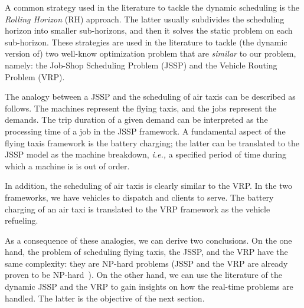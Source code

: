 A common strategy used in the literature to tackle the dynamic scheduling is the \textit{Rolling Horizon} (\acs{RH}) approach. The latter usually subdivides the scheduling horizon into smaller sub-horizons, and then it solves the static problem on each sub-horizon. These strategies are used in the literature to tackle (the dynamic version of) two well-know optimization problem that are \emph{similar} to our problem, namely: the Job-Shop Scheduling Problem (\acs{JSSP}) and the Vehicle Routing Problem (\acs{VRP}). 

The analogy between a \acs{JSSP} and the scheduling of air taxis can be described as follows. The machines represent the flying taxis, and the jobs represent the demands. The trip duration of a given demand can be interpreted as the processing time of a job in the \acs{JSSP} framework. A fundamental aspect of the flying taxis framework is the battery charging; the latter can be translated to the \acs{JSSP} model as the machine breakdown, \textit{i.e.,} a specified period of time during which a machine is is out of order.

In addition, the scheduling of air taxis is clearly similar to the \acs{VRP}. In the two frameworks, we have vehicles to dispatch and clients to serve. The battery charging of an air taxi is translated to the VRP framework as the vehicle refueling.

As a consequence of these analogies, we can derive two conclusions. On the one hand, the problem of scheduling flying taxis, the \acs{JSSP}, and the \acs{VRP} have the same complexity: they are NP-hard problems (\acs{JSSP} and the \acs{VRP} are already proven to be NP-hard~\cite{mohan2019,song2016}). On the other hand, we can use the literature of the dynamic \acs{JSSP} and the \acs{VRP} to gain insights on how the real-time problems are handled. The latter is the objective of the next section.


